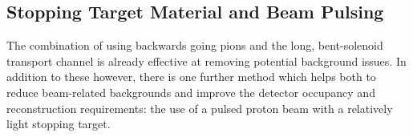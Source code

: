 %
%

\subsection{Stopping Target Material and Beam Pulsing}
\label{sec:stop-tgt}
\FigMuonNuclearParams

The combination of using backwards going pions and the long, bent-solenoid transport channel is already effective at removing potential background issues.
In addition to these however, there is one further method which helps both to reduce beam-related backgrounds and improve the detector occupancy and reconstruction requirements:
the use of a pulsed proton beam with a relatively light stopping target.

